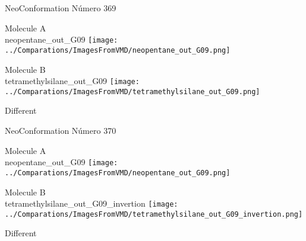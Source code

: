 \vtab[-2cm]
\begin{center}
{\large NeoConformation \tab Número 369}
\end{center}
\begin{multicols}{2}
\begin{center}
Molecule A \\ 
neopentane\_out\_G09
\texttt{[image: ../Comparations/ImagesFromVMD/neopentane\_out\_G09.png]}
\\
\vtab

\columnbreak
Molecule B \\ 
tetramethylsilane\_out\_G09
\texttt{[image: ../Comparations/ImagesFromVMD/tetramethylsilane\_out\_G09.png]}
\\
\vtab


\end{center}
\end{multicols}
\begin{center}
\vtab
\vtab
\textcolor{NavyBlue}{\Large Different}
\end{center}

 \newpage

\vtab[-2cm]
\begin{center}
{\large NeoConformation \tab Número 370}
\end{center}
\begin{multicols}{2}
\begin{center}
Molecule A \\ 
neopentane\_out\_G09
\texttt{[image: ../Comparations/ImagesFromVMD/neopentane\_out\_G09.png]}
\\
\vtab

\columnbreak
Molecule B \\ 
tetramethylsilane\_out\_G09\_invertion
\texttt{[image: ../Comparations/ImagesFromVMD/tetramethylsilane\_out\_G09\_invertion.png]}
\\
\vtab


\end{center}
\end{multicols}
\begin{center}
\vtab
\vtab
\textcolor{NavyBlue}{\Large Different}
\end{center}

 \newpage

